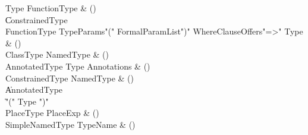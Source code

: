 \begin{bbgrammar}
 Type  \label{prod:Type}  \: FunctionType & ()\\
    \| ConstrainedType\\
 FunctionType  \label{prod:FunctionType}  \: TypeParams\opt \xcd"(" FormalParamList\opt \xcd")" WhereClause\opt Offers\opt \xcd"=>" Type & ()\\
 ClassType  \label{prod:ClassType}  \: NamedType & ()\\
 AnnotatedType  \label{prod:AnnotatedType}  \: Type Annotations & ()\\
 ConstrainedType  \label{prod:ConstrainedType}  \: NamedType & ()\\
    \| AnnotatedType\\
    \| \xcd"(" Type \xcd")"\\
 PlaceType  \label{prod:PlaceType}  \: PlaceExp & ()\\
 SimpleNamedType  \label{prod:SimpleNamedType}  \: TypeName & ()\\
\end{bbgrammar}

